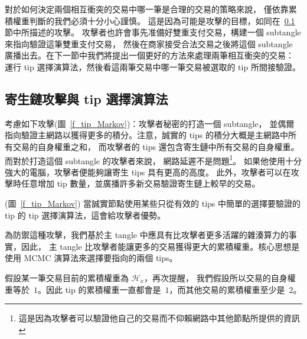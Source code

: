 \documentclass[12pt]{article}
\newcommand{\HH}{\mathcal{H}}
\begin{document}
\begin{CJK}{UTF8}{bkai}
對於如何決定兩個相互衝突的交易中哪一筆是合理的交易的策略來說， 
僅依靠累積權重判斷的我們必須十分小心謹慎。
這是因為可能是攻擊的目標，如同在~\ref{s_parasite} 節中所描述的攻擊。
攻擊者也許會事先准備好雙重支付交易，構建一個 subtangle 來指向驗證這筆雙重支付交易，
然後在商家接受合法交易之後將這個 subtangle 廣播出去。在下一節中我們將提出一個更好的方法來處理兩筆相互衝突的交易：
運行 tip 選擇演算法，然後看這兩筆交易中哪一筆交易被選取的 tip 所間接驗證。

\subsection{寄生鏈攻擊與 tip 選擇演算法}
\label{s_parasite}
考慮如下攻擊(圖~\ref{f_tip_Markov})：攻擊者秘密的打造一個 subtangle，
並偶爾指向驗證主網路以獲得更多的積分。注意，誠實的 tips 的積分大概是主網路中所有交易的自身權重之和，
而攻擊者的 tips 還包含寄生鏈中所有交易的自身權重。而對於打造這個 subtangle 的攻擊者來說，
網路延遲不是問題\footnote{這是因為攻擊者可以驗證他自己的交易而不仰賴網路中其他節點所提供的資訊}。
如果他使用十分強大的電腦，攻擊者便能夠讓寄生 tips 具有更高的高度。
此外，攻擊者可以在攻擊時任意增加 tip 數量，並廣播許多新交易驗證寄生鏈上較早的交易。
 
(圖~\ref{f_tip_Markov})
當誠實節點使用某些只從有效的 tips 中簡單的選擇要驗證的 tip 的 tip 選擇演算法，這會給攻擊者優勢。

為防禦這種攻擊，我們基於主 tangle 中應具有比攻擊者更多活躍的雜湊算力的事實，因此，
主 tangle 比攻擊者能讓更多的交易獲得更大的累積權重。核心思想是使用 MCMC 演算法來選擇要指向的兩個 tips。

假設某一筆交易目前的累積權重為 $\HH_x$，再次提醒，
我們假設所以交易的自身權重等於~$1$。因此 tip 的累積權重一直都會是~$1$，而其他交易的累積權重至少是~$2$。


\end{CJK}
\end{document}
